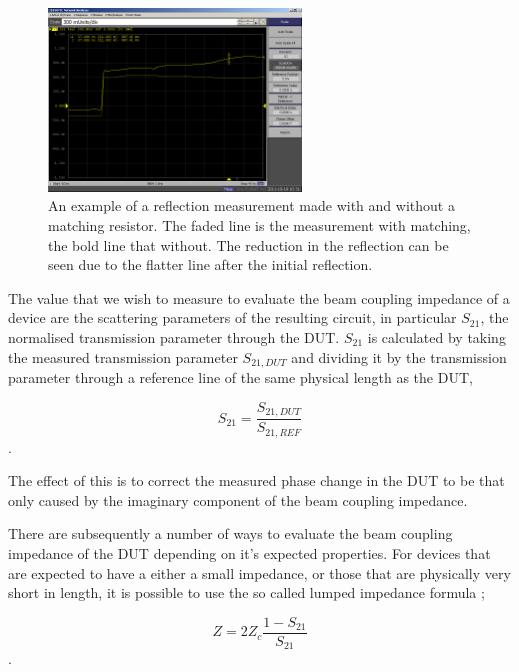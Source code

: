 \begin{figure}
\begin{center}
\includegraphics[width=0.6\textwidth]{Bench_Top_Measurements/figures/coax-matching-no-matching.png}
\end{center}
\caption{An example of a reflection measurement made with and without a matching resistor. The faded line is the measurement with matching, the bold line that without. The reduction in the reflection can be seen due to the flatter line after the initial reflection.}
\label{fig:matching-plot}
\end{figure}

The value that we wish to measure to evaluate the beam coupling impedance of a device are the scattering parameters of the resulting circuit, in particular $S_{21}$, the normalised transmission parameter through the DUT. $S_{21}$ is calculated by taking the measured transmission parameter $S_{21,DUT}$ and dividing it by the transmission parameter through a reference line of the same physical length as the DUT,

\begin{equation}
S_{21} = \frac{S_{21,DUT}}{S_{21,REF}}
\end{equation}.

The effect of this is to correct the measured phase change in the DUT to be that only caused by the imaginary component of the beam coupling impedance.

There are subsequently a number of ways to evaluate the beam coupling impedance of the DUT depending on it's expected properties. For devices that are expected to have a either a small impedance, or those that are physically very short in length, it is possible to use the so called lumped impedance formula \cite{Hahn:BenchMeasInter, Hahn: ValidityImpMeas};

\begin{equation}
Z = 2Z_{c} \frac{1-S_{21}}{S_{21}}
\end{equation}.

